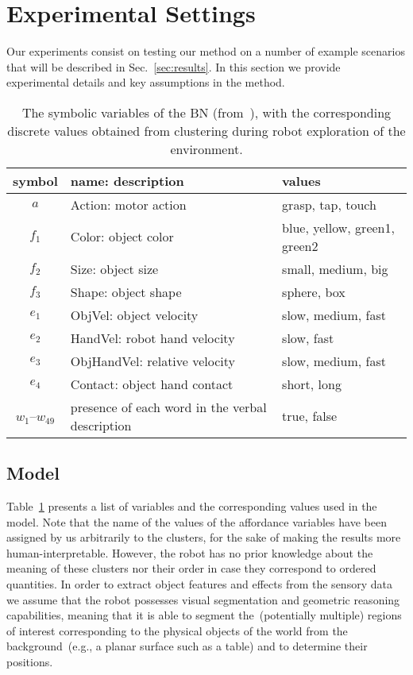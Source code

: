 
\section{Experimental Settings}
\label{sec:experimental_settings}
Our experiments consist on testing our method on a number of example scenarios that will be described in Sec.~\ref{sec:results}.
In this section we provide experimental details and key assumptions in the method.

\begin{table}
    \centering
    \caption{The symbolic variables of the \acl{BN} (from~\cite{salvi:2012:smcb}), with the corresponding discrete values obtained from clustering during robot exploration of the environment.}
    \label{tab:bnsymb}
    \begin{tabular}{cp{3.3cm}l}
    \toprule
    symbol & name: description     & values \\
    \midrule
    $a$    & Action: motor action  & grasp, tap, touch \\
    \midrule
    $f_1$  & Color: object color   & blue, yellow, green1, green2 \\
    $f_2$  & Size: object size     & small, medium, big \\
    $f_3$  & Shape: object shape   & sphere, box \\ %
    \midrule
    $e_1$  & ObjVel: object velocity                     & slow, medium, fast \\
    $e_2$  & HandVel: robot hand velocity                & slow, fast \\
    $e_3$  & ObjHandVel: relative \objecthand{} velocity & slow, medium, fast \\
    $e_4$  & Contact: object hand contact                & short, long \\
    \midrule
    $w_1$--$w_{49}$ & presence of each word in the verbal description & true, false \\
    \bottomrule
    \end{tabular}
\end{table}

\subsection{\AffWords{} Model}
Table~\ref{tab:bnsymb} presents a list of variables and the corresponding values used in the \AffWords{} model.
Note that the name of the values of the affordance variables have been assigned by us arbitrarily to the clusters, for the sake of making the results more human-interpretable.
However, the robot has no prior knowledge about the meaning of these clusters nor their order in case they correspond to ordered quantities.
In order to extract object features and effects from the sensory data we assume that the robot possesses visual segmentation and geometric reasoning capabilities, meaning that it is able to segment the~(potentially multiple) regions of interest corresponding to the physical objects of the world from the background~(e.g., a planar surface such as a table) and to determine their positions.

